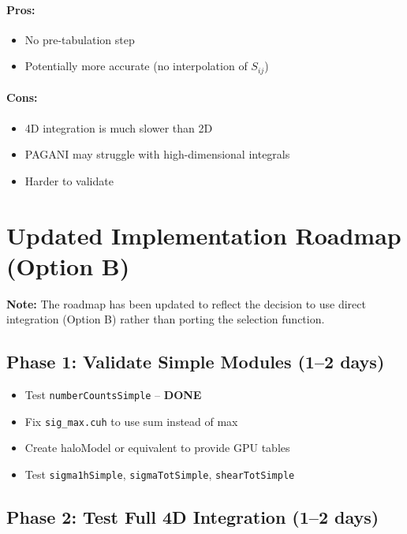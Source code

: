 \documentclass[a4paper, 11pt]{article}
\begin{document}
\paragraph{Pros:}
\begin{itemize}
  \setlength\itemsep{2pt}
  \item No pre-tabulation step
  \item Potentially more accurate (no interpolation of $S_{ij}$)
\end{itemize}

\paragraph{Cons:}
\begin{itemize}
  \setlength\itemsep{2pt}
  \item 4D integration is much slower than 2D
  \item PAGANI may struggle with high-dimensional integrals
  \item Harder to validate
\end{itemize}

\section{Updated Implementation Roadmap (Option B)}
\label{sec:roadmap}

\textbf{Note:} The roadmap has been updated to reflect the decision to use direct integration (Option B) rather than porting the selection function.

\subsection{Phase 1: Validate Simple Modules (1--2 days)}

\begin{itemize}
  \item[\textcolor{green!50!black}{$\checkmark$}] Test \texttt{numberCountsSimple} -- \textbf{DONE}
  \item[$\square$] Fix \texttt{sig\_max.cuh} to use sum instead of max
  \item[$\square$] Create haloModel or equivalent to provide GPU tables
  \item[$\square$] Test \texttt{sigma1hSimple}, \texttt{sigmaTotSimple}, \texttt{shearTotSimple}
\end{itemize}

\subsection{Phase 2: Test Full 4D Integration (1--2 days)}
\end{document}
